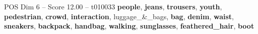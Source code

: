 \begin{textsample}{POS Dim 6 – Score 12.00 – t010033}  \label{ex:f6_pos_032}
\textbf{people}, \textbf{jeans}, \textbf{trousers}, \textbf{youth}, \textbf{pedestrian}, \textbf{crowd}, \textbf{interaction}, luggage\_\&\_bags, \textbf{bag}, \textbf{denim}, \textbf{waist}, \textbf{sneakers}, \textbf{backpack}, \textbf{handbag}, \textbf{walking}, \textbf{sunglasses}, \textbf{feathered\_hair}, \textbf{boot}

\end{textsample}
